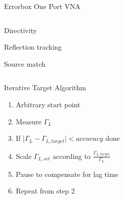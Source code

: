 \documentclass{beamer}
\providecommand{\abs}[1]{\lvert#1\rvert}
\begin{document}
\begin{frame}{Errorbox One Port VNA}
\begin{columns}
        \column{5cm}
            \begin{description}
                \item<alert@2>[$S_{11}$] Directivity
                \item<alert@3>[$S_{12}$] Reflection tracking
                \item<alert@4>[$S_{22}$] Source match
            \end{description}
    \end{columns}
\end{frame}

\begin{frame}{Iterative Target Algorithm}
    \begin{enumerate}
        \item Arbitrary start point
        \item Measure $\Gamma_L$
        \item If $\abs{\Gamma_L - \Gamma_{L,target}} < accuracy$ \Rightarrow done
        \item Scale $\Gamma_{L,set}$ according to $\frac{\Gamma_{L,target}}{\Gamma_L}$
        \item Pause to compensate for lag time
        \item Repeat from step 2
    \end{enumerate}
\end{frame}
\end{document}
